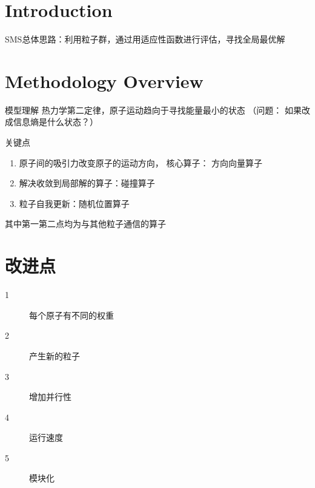 \documentclass[
10pt, %
a4paper, %
twocolumn, %
landscape %
]{article}
\begin{document}
\begin{CJK*}{UTF8}{gbsn}
\pagestyle{myheadings} %
\markright{\doctitle} %


\thispagestyle{plain} %

\printtitle %


\section*{Introduction} %
SMS总体思路：利用粒子群，通过用适应性函数进行评估，寻找全局最优解



\section{Methodology Overview} %

模型理解
热力学第二定律，原子运动趋向于寻找能量最小的状态 （问题： 如果改成信息熵是什么状态？）

关键点
\begin{enumerate}
\item 原子间的吸引力改变原子的运动方向， 核心算子： 方向向量算子
\item 解决收敛到局部解的算子：碰撞算子 
\item 粒子自我更新：随机位置算子

\end{enumerate}

其中第一第二点均为与其他粒子通信的算子


\section{改进点}

\begin{description}
\item[1] 每个原子有不同的权重
\item[2] 产生新的粒子
\item[3] 增加并行性
\item[4] 运行速度
\item[5] 模块化
\end{description}


\end{CJK*}
\end{document}
